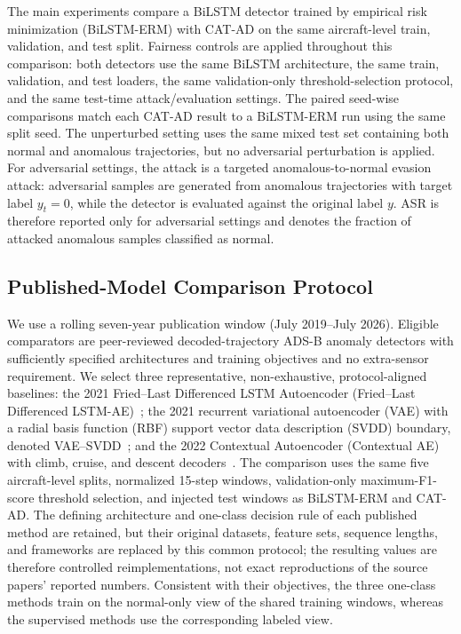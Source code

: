 \documentclass[runningheads]{llncs}
\begin{document}
The main experiments compare a BiLSTM detector trained by empirical risk minimization (BiLSTM-ERM) with CAT-AD on the same aircraft-level train, validation, and test split.
Fairness controls are applied throughout this comparison: both detectors use the same BiLSTM architecture, the same train, validation, and test loaders, the same validation-only threshold-selection protocol, and the same test-time attack/evaluation settings.
The paired seed-wise comparisons match each CAT-AD result to a BiLSTM-ERM run using the same split seed.
The unperturbed setting uses the same mixed test set containing both normal and anomalous trajectories, but no adversarial perturbation is applied.
For adversarial settings, the attack is a targeted anomalous-to-normal evasion attack: adversarial samples are generated from anomalous trajectories with target label $y_t=0$, while the detector is evaluated against the original label $y$.
ASR is therefore reported only for adversarial settings and denotes the fraction of attacked anomalous samples classified as normal.

\subsection{Published-Model Comparison Protocol}
\label{subsec:published_comparison_protocol}

We use a rolling seven-year publication window (July 2019--July 2026).
Eligible comparators are peer-reviewed decoded-trajectory ADS-B anomaly detectors with sufficiently specified architectures and training objectives and no extra-sensor requirement.
We select three representative, non-exhaustive, protocol-aligned baselines: the 2021 Fried--Last Differenced LSTM Autoencoder (Fried--Last Differenced LSTM-AE)~\cite{fried2021autoencoders}; the 2021 recurrent variational autoencoder (VAE) with a radial basis function (RBF) support vector data description (SVDD) boundary, denoted VAE--SVDD~\cite{luo2021vaesvdd}; and the 2022 Contextual Autoencoder (Contextual AE) with climb, cruise, and descent decoders~\cite{chevrot2022cae}.
The comparison uses the same five aircraft-level splits, normalized 15-step windows, validation-only maximum-F1-score threshold selection, and injected test windows as BiLSTM-ERM and CAT-AD.
The defining architecture and one-class decision rule of each published method are retained, but their original datasets, feature sets, sequence lengths, and frameworks are replaced by this common protocol; the resulting values are therefore controlled reimplementations, not exact reproductions of the source papers' reported numbers.
Consistent with their objectives, the three one-class methods train on the normal-only view of the shared training windows, whereas the supervised methods use the corresponding labeled view.
\end{document}
